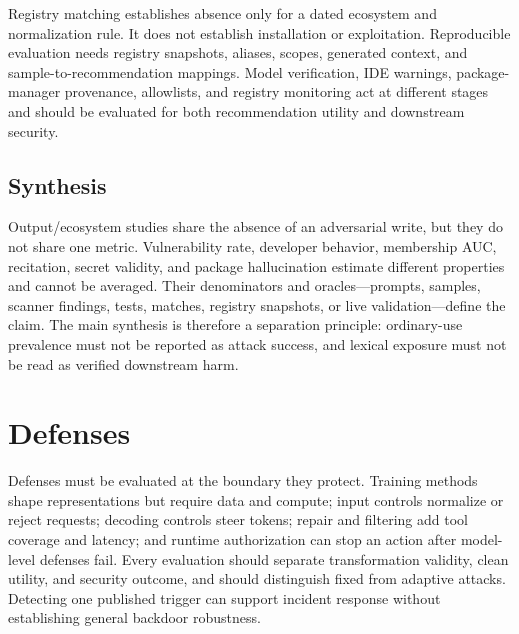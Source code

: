 \documentclass[acmsmall,screen,review]{acmart}
\begin{document}
Registry matching establishes absence only for a dated ecosystem and normalization rule. It does not establish installation or exploitation. Reproducible evaluation needs registry snapshots, aliases, scopes, generated context, and sample-to-recommendation mappings. Model verification, IDE warnings, package-manager provenance, allowlists, and registry monitoring act at different stages and should be evaluated for both recommendation utility and downstream security.

\subsection{Synthesis} \label{sec:gensec:discussion}
Output/ecosystem studies share the absence of an adversarial write, but they do not share one metric. Vulnerability rate, developer behavior, membership AUC, recitation, secret validity, and package hallucination estimate different properties and cannot be averaged. Their denominators and oracles---prompts, samples, scanner findings, tests, matches, registry snapshots, or live validation---define the claim. The main synthesis is therefore a separation principle: ordinary-use prevalence must not be reported as attack success, and lexical exposure must not be read as verified downstream harm.

\section{Defenses} \label{sec:defense}

Defenses must be evaluated at the boundary they protect. Training methods shape representations but require data and compute; input controls normalize or reject requests; decoding controls steer tokens; repair and filtering add tool coverage and latency; and runtime authorization can stop an action after model-level defenses fail. Every evaluation should separate transformation validity, clean utility, and security outcome, and should distinguish fixed from adaptive attacks. Detecting one published trigger can support incident response without establishing general backdoor robustness.
\end{document}
